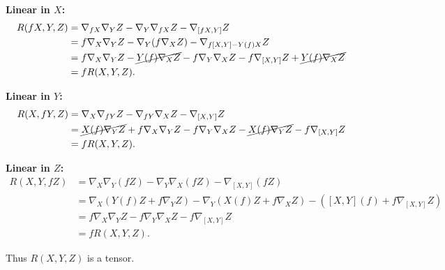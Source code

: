 \documentclass[twoside,10pt]{report}
\begin{document}
\textbf{Linear in $X$:}
\begin{align*}
	R(fX,Y,Z) &= \nabla_{fX}\nabla_{Y}Z - \nabla_{Y}\nabla_{fX}Z-\nabla_{[fX,Y]}Z \\
		  &= f\nabla_{X}\nabla_{Y}Z-\nabla_{Y}(f\nabla_{X}Z)-\nabla_{f[X,Y]-Y(f)X}Z \\
		  &= f\nabla_{X}\nabla_{Y}Z-\cancel{Y(f)\nabla_{X}Z}-f\nabla_{Y}\nabla_{X}Z-f\nabla_{[X,Y]}Z+\cancel{Y(f)\nabla_{X}Z} \\
		  &= fR(X,Y,Z).
\end{align*}

\textbf{Linear in $Y$:} 
\begin{align*}
	R(X,fY,Z) &= \nabla_{X}\nabla_{fY}Z-\nabla_{fY}\nabla_{X}Z-\nabla_{[X,Y]}Z \\
		  &= \cancel{X(f)\nabla_{Y}Z}+f\nabla_{X}\nabla_{Y}Z-f\nabla_{Y}\nabla_{X}Z-\cancel{X(f)\nabla_{Y}Z}-f\nabla_{[X,Y]}Z \\
		  &= fR(X,Y,Z).
\end{align*}

\textbf{Linear in $Z$:} 
\begin{align*}
	R(X,Y,fZ) &= \nabla_{X}\nabla_{Y}(fZ) - \nabla_{Y}\nabla_{X}(fZ)-\nabla_{[X,Y]}(fZ) \\
		  &= \nabla_{X}(Y(f)Z+f\nabla_{Y}Z) - \nabla_{Y}(X(f)Z+f\nabla_{X}Z)-([X,Y](f)+f\nabla_{[X,Y]}Z) \\
		  &= f\nabla_{X}\nabla_{Y}Z-f\nabla_{Y}\nabla_{X}Z-f\nabla_{[X,Y]}Z \\
		  &= fR(X,Y,Z).
\end{align*}

Thus $R(X,Y,Z)$ is a tensor.
\end{document}
